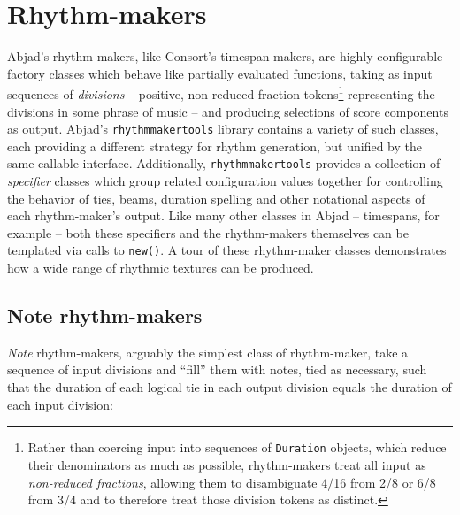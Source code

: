 \section{Rhythm-makers}
\label{sec:rhythm-makers}

Abjad's rhythm-makers, like Consort's timespan-makers, are highly-configurable
factory classes which behave like partially evaluated functions, taking as
input sequences of \emph{divisions} -- positive, non-reduced fraction
tokens\footnote{Rather than coercing input into sequences of \texttt{Duration}
objects, which reduce their denominators as much as possible, rhythm-makers
treat all input as \emph{non-reduced fractions}, allowing them to disambiguate
4/16 from 2/8 or 6/8 from 3/4 and to therefore treat those division tokens as
distinct.} representing the divisions in some phrase of music -- and producing
selections of score components as output. Abjad's \texttt{rhythmmakertools}
library contains a variety of such classes, each providing a different strategy
for rhythm generation, but unified by the same callable interface.
Additionally, \texttt{rhythmmakertools} provides a collection of
\emph{specifier} classes which group related configuration values together for
controlling the behavior of ties, beams, duration spelling and other notational
aspects of each rhythm-maker's output. Like many other classes in Abjad --
timespans, for example -- both these specifiers and the rhythm-makers
themselves can be templated via calls to \texttt{new()}. A tour of these
rhythm-maker classes demonstrates how a wide range of rhythmic textures can be
produced.

\subsection{Note rhythm-makers}
\label{ssec:note-rhythm-makers}

\emph{Note} rhythm-makers, arguably the simplest class of rhythm-maker, take a
sequence of input divisions and \enquote{fill} them with notes, tied as
necessary, such that the duration of each logical tie in each output division
equals the duration of each input division:

\begin{comment}
<abjad>
note_rhythm_maker = rhythmmakertools.NoteRhythmMaker()
divisions = [(3, 8), (4, 8), (3, 16), (4, 16), (5, 8), (2, 4)]
show(note_rhythm_maker, divisions=divisions)
</abjad>
\end{comment}

